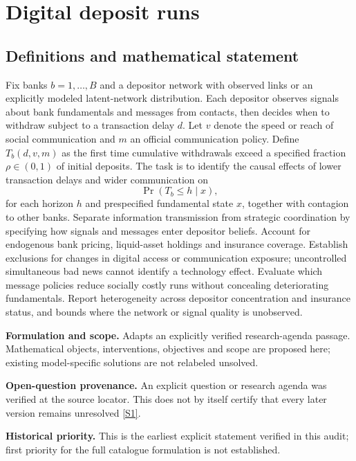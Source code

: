 \documentclass[11pt]{article}
\newcommand{\sref}[2]{\hyperlink{source:#1:#2}{[S#2]}}
\begin{document}
\section*{Digital deposit runs}\label{30007604}
\subsection{Definitions and mathematical statement}
Fix banks \(b=1,\ldots,B\) and a depositor network with observed links or an explicitly modeled latent-network distribution. Each depositor observes signals about bank fundamentals and messages from contacts, then decides when to withdraw subject to a transaction delay \(d\). Let \(v\) denote the speed or reach of social communication and \(m\) an official communication policy. Define \(T_b(d,v,m)\) as the first time cumulative withdrawals exceed a specified fraction \(\rho\in(0,1)\) of initial deposits. The task is to identify the causal effects of lower transaction delays and wider communication on
\[\Pr(T_b\leq h\mid x),\]
for each horizon \(h\) and prespecified fundamental state \(x\), together with contagion to other banks. Separate information transmission from strategic coordination by specifying how signals and messages enter depositor beliefs. Account for endogenous bank pricing, liquid-asset holdings and insurance coverage. Establish exclusions for changes in digital access or communication exposure; uncontrolled simultaneous bad news cannot identify a technology effect. Evaluate which message policies reduce socially costly runs without concealing deteriorating fundamentals. Report heterogeneity across depositor concentration and insurance status, and bounds where the network or signal quality is unobserved.

\par\textbf{Formulation and scope.} Adapts an explicitly verified research-agenda passage. Mathematical objects, interventions, objectives and scope are proposed here; existing model-specific solutions are not relabeled unsolved.

\par\textbf{Open-question provenance.} An explicit question or research agenda was verified at the source locator. This does not by itself certify that every later version remains unresolved \sref{30007604}{1}.

\par\textbf{Historical priority.} This is the earliest explicit statement verified in this audit; first priority for the full catalogue formulation is not established.
\end{document}
